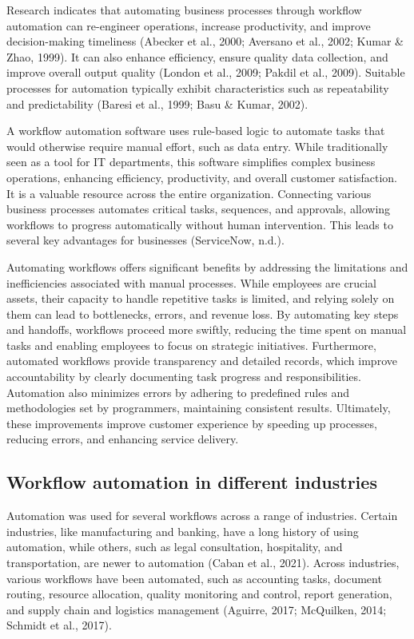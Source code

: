Research indicates that automating business processes through workflow automation can re-engineer operations, increase productivity, and improve decision-making timeliness (Abecker et al., 2000; Aversano et al., 2002; Kumar \& Zhao, 1999). It can also enhance efficiency, ensure quality data collection, and improve overall output quality (London et al., 2009; Pakdil et al., 2009). Suitable processes for automation typically exhibit characteristics such as repeatability and predictability (Baresi et al., 1999; Basu \& Kumar, 2002). 

A workflow automation software uses rule-based logic to automate tasks that would otherwise require manual effort, such as data entry. While traditionally seen as a tool for IT departments, this software simplifies complex business operations, enhancing efficiency, productivity, and overall customer satisfaction. It is a valuable resource across the entire organization. Connecting various business processes automates critical tasks, sequences, and approvals, allowing workflows to progress automatically without human intervention. This leads to several key advantages for businesses (ServiceNow, n.d.).

Automating workflows offers significant benefits by addressing the limitations and inefficiencies associated with manual processes. While employees are crucial assets, their capacity to handle repetitive tasks is limited, and relying solely on them can lead to bottlenecks, errors, and revenue loss. By automating key steps and handoffs, workflows proceed more swiftly, reducing the time spent on manual tasks and enabling employees to focus on strategic initiatives. Furthermore, automated workflows provide transparency and detailed records, which improve accountability by clearly documenting task progress and responsibilities. Automation also minimizes errors by adhering to predefined rules and methodologies set by programmers, maintaining consistent results. Ultimately, these improvements improve customer experience by speeding up processes, reducing errors, and enhancing service delivery. 

\subsection{Workflow automation in different industries}

Automation was used for several workflows across a range of industries. Certain industries, like manufacturing and banking, have a long history of using automation, while others, such as legal consultation, hospitality, and transportation, are newer to automation (Caban et al., 2021). Across industries, various workflows have been automated, such as accounting tasks, document routing, resource allocation, quality monitoring and control, report generation, and supply chain and logistics management (Aguirre, 2017; McQuilken, 2014; Schmidt et al., 2017).


